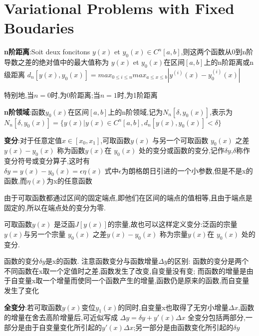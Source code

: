 \section{Variational Problems with Fixed Boudaries}
\begin{definition}
  \textbf{n阶距离}:Soit deux foncitons $y(x)$ et $y_0(x)\in C^{n}[a,b]$,则这两个函数从0到n阶导数之差的绝对值中的最大值称为 $y(x)$ et $y_0(x)$在区间$[a,b]$上的n阶距离或n级距离
  $d_n[y(x),y_0(x)]=max_{0 \leqslant i \leqslant n}max_{a \leqslant x \leqslant b}|y^{(i)}(x)-y_0^{(i)}(x)|$
\end{definition}
特别地,当$n=0$时,为0阶距离;当$n=1$时,为1阶距离

\begin{definition}
\textbf{n阶领域}:函数$y_0(x)$在区间$[a,b]$上的n阶领域,记为$N_n[\delta,y_0(x)]$,表示为\newline
$N_n[\delta,y_0(x)]=\{y(x)|y(x)\in C^{n}[a,b],d_n[y(x),y_0(x)] < \delta \}$
\end{definition}
\begin{definition}
\textbf{变分}:对于任意定值$x \in [x_0,x_1]$,可取函数$y(x)$ 与另一个可取函数 $y_0(x)$ 之差$y(x)-y_0(x)$ 称为函数$y(x)$在 $y_0(x)$ 处的变分或函数的变分,记作$\delta y$,$\delta$称作变分符号或变分算子,这时有\\
$\delta y=y(x)-y_0(x)=\epsilon\eta(x)$ \newline
式中$\epsilon$为朗格朗日引进的一个小参数,但是不是x的函数,而$\eta(x)$为x的任意函数
\end{definition}
由于可取函数都通过区间的固定端点,即他们在区间的端点的值相等,且由于端点是固定的,所以在端点处的变分为零. \newline

可取函数$y(x)$ 是泛函$J[y(x)]$的宗量,故也可以这样定义变分:泛函的宗量$y(x)$与另一个宗量 $y_0(x)$ 之差$y(x)-y_0(x)$ 称为宗量$y(x)$在 $y_0(x)$ 处的变分.

\begin{attention}
函数的变分$\delta y$是x的函数.\newline
注意函数变分与函数增量$\Delta y$的区别:\newline
函数的变分是两个不同函数在x取一个定值时之差,函数发生了改变,自变量没有变;\newline
而函数的增量是由于自变量x取一个增量而使同一个函数产生的增量,函数仍是原来的函数,而自变量发生了变化
\end{attention}

\textbf{全变分}:若可取函数$y(x)$变位$y_1(x)$的同时,自变量x也取得了无穷小增量$\Delta x$,函数的增量在舍去高阶增量后,可近似写成\newline
$\Delta y=\delta y + y'(x)\Delta x$
\newline
全变分包括两部分,一部分是由于自变量变化所引起的$y'(x)\Delta x$;另一部分是由函数变化所引起的$\delta y $

